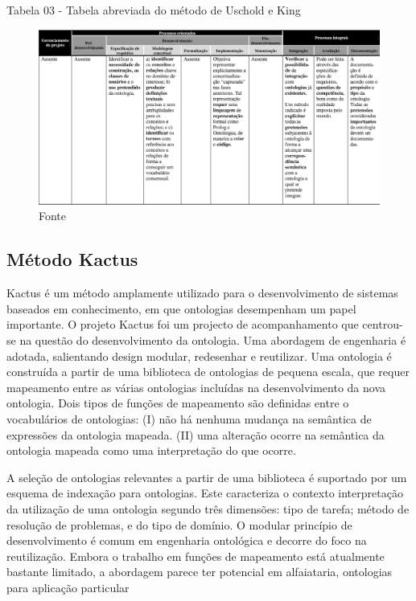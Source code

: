 \documentclass[a4paper]{report}
\begin{document}
\pagebreak
Tabela 03 - Tabela abreviada do método de Uschold e King

\begin{figure}[h] 
\centering %
\includegraphics[scale=0.3]{Figuras/6.png} %
\caption{Fonte%
}
\end{figure}

\subsection{Método Kactus} 
\qquad Kactus é um método amplamente utilizado para o desenvolvimento de sistemas baseados em conhecimento, em que ontologias desempenham um papel importante. O projeto Kactus foi um projecto de acompanhamento que centrou-se na questão do desenvolvimento da ontologia. Uma abordagem de engenharia é adotada, salientando design modular, redesenhar e reutilizar. Uma ontologia é construída a partir de uma biblioteca de ontologias de pequena escala, que requer mapeamento entre as várias ontologias incluídas na desenvolvimento da nova ontologia. Dois tipos de funções de mapeamento são definidas entre o vocabulários de ontologias:
(I) não há nenhuma mudança na semântica de expressões da ontologia mapeada.
(II) uma alteração ocorre na semântica da ontologia mapeada como uma interpretação do que ocorre.

A seleção de ontologias relevantes a partir de uma biblioteca é suportado por um esquema de indexação para ontologias. Este caracteriza o contexto interpretação da utilização de uma ontologia segundo três dimensões: tipo de tarefa; método de resolução de problemas, e do tipo de domínio. O modular princípio de desenvolvimento é comum em engenharia ontológica e decorre do foco na reutilização. Embora o trabalho em funções de mapeamento está atualmente bastante limitado, a abordagem parece ter potencial em alfaiataria, ontologias para aplicação particular %
\end{document}
